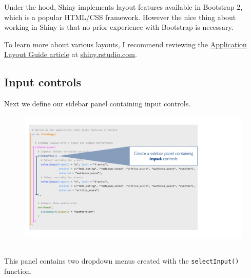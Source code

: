 \documentclass[
  letterpaper,
  DIV=11,
  numbers=noendperiod]{scrreprt}
\begin{document}
Under the hood, Shiny implements layout features available in Bootstrap
2, which is a popular HTML/CSS framework. However the nice thing about
working in Shiny is that no prior experience with Bootstrap is
necessary.

To learn more about various layouts, I recommend reviewing the
\href{https://shiny.rstudio.com/articles/layout-guide.html}{Application
Layout Guide article} at \url{shiny.rstudio.com}.

\hypertarget{input-controls}{%
\subsection{Input controls}\label{input-controls}}

Next we define our sidebar panel containing input controls.

\begin{figure}

{\centering \includegraphics[width=1\textwidth,height=\textheight]{./images/input-controls.png}

}

\end{figure}

\hypertarget{section-2}{%
\subsection{}\label{section-2}}

This panel contains two dropdown menus created with the
\texttt{selectInput()} function.
\end{document}
